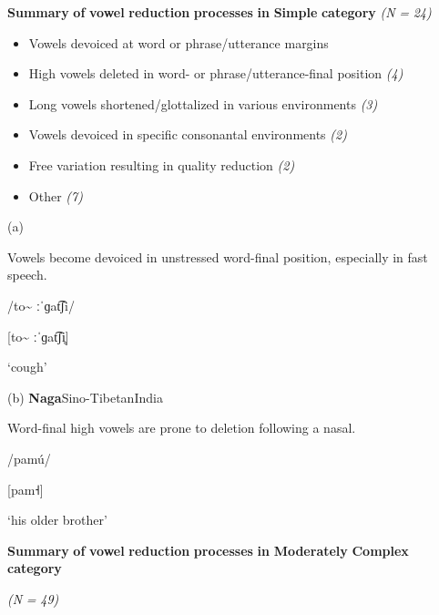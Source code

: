 \ea\label{ex:(6.16)}
  \textbf{Summary} \textbf{of} \textbf{vowel} \textbf{reduction} \textbf{processes} \textbf{in} \textbf{Simple} \textbf{category} \textit{(N} \textit{=} \textit{24)}

\begin{itemize}
\item 
Vowels devoiced at word or phrase/utterance margins \textit{}

\item 
High vowels deleted in word- or phrase/utterance-final position \textit{(4)}

\item 
Long vowels shortened/glottalized in various environments \textit{(3)}

\item 
Vowels devoiced in specific consonantal environments \textit{(2)}

\item 
Free variation resulting in quality reduction \textit{(2)}

\item 
Other \textit{(7)}

\end{itemize}

(a)

Vowels become devoiced in unstressed word-final position, especially in fast speech.

/to\~{} ːˈɡat͡ʃi/

[to\~{} ːˈɡat͡ʃi̥]

\glt ‘cough’

\citep[60-1]{Facundes2000}

(b) \textbf{Naga}{Sino-Tibetan}{India}

Word-final high vowels are prone to deletion following a nasal.

/pamú/

[pam˧]

\glt ‘his older brother’

\citep[369]{Teo2012}
\z

\ea\label{ex:(6.17)}
  \textbf{Summary} \textbf{of} \textbf{vowel} \textbf{reduction} \textbf{processes} \textbf{in} \textbf{Moderately} \textbf{Complex} \textbf{category} 

\textit{(N} \textit{=} \textit{49)}

